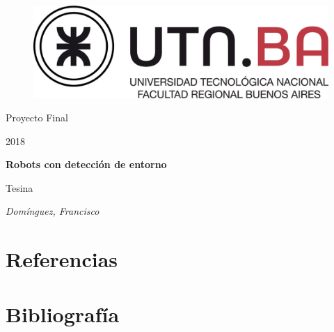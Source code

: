 \documentclass[a4paper,10pt]{article}
\begin{document}
\begin{titlepage}
\centering
\begin{figure}[t]
	\centering
	\includegraphics[scale=0.15]{utn.jpg}
    \vspace{0.5cm}
\end{figure}%
	{\LARGE Proyecto Final\par}
    {\LARGE 2018\par}
	\vspace{1cm}
	{\huge\bfseries Robots con detección de entorno\par}
	\vspace{1cm}
    {\LARGE Tesina\par}
    \vspace{1cm}
	{\Large\itshape Domínguez, Francisco\par}
	\vfill
\end{titlepage}


\tableofcontents

\newpage
\listoffigures
\newpage
\listoftables

\newpage


\newpage


\newpage


\newpage

\newpage


\newpage


\newpage


\newpage


\newpage


\newpage
\section{Referencias}
\label{sec:6_refs}

\newpage
\section{Bibliografía}
\label{sec:7_biblio}
\end{document}
